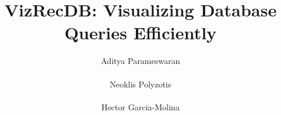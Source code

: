 \documentclass{sig-alternate}
\begin{document}
\newcommand{\VizRecDB}{{\sf VizRecDB}}
\newcommand{\calQ}{\mathcal{Q}}
\newcommand{\calR}{\mathcal{R}}
\newcommand{\att}[1]{{\text{#1}}}

\newtheorem{definition}{Definition}[section]
\newtheorem{example}[definition]{Example}
\newtheorem{goal}{Goal}[section]
\renewcommand{\baselinestretch}{0.995}





\newcommand{\squishlist}{
   \begin{list}{$\bullet$}
    { \setlength{\itemsep}{0pt}
      \setlength{\parsep}{2pt}
      \setlength{\topsep}{0pt}
      \setlength{\partopsep}{0pt}
      \leftmargin=25pt
\rightmargin=0pt
\labelsep=5pt
\labelwidth=10pt
\itemindent=0pt
\listparindent=0pt
\itemsep=\parsep
    }
}
\newcommand{\squishend}{\end{list}}

\newenvironment{denselist}{
    \begin{list}{\tiny{$\bullet$}}%
    {\setlength{\itemsep}{0ex} \setlength{\topsep}{0ex}
    \setlength{\parsep}{0pt} \setlength{\itemindent}{0pt}
    \setlength{\leftmargin}{0.5em}
    \setlength{\partopsep}{0pt}}}%
    {\end{list}}

\newcommand{\eat}[1]{}
\newcommand{\papertext}[1]{#1}
\newcommand{\techreport}[1]{}

\newcommand{\techreporttext}[1]{}
\newcommand{\stitle}[1]{\vspace{0.25em}\noindent\textbf{#1}}




\title{VizRecDB: Visualizing Database Queries Efficiently\vspace{-5pt}}



\author{
\alignauthor
Aditya Parameswaran \\ 
 \\
\alignauthor Neoklis Polyzotis \\ 
 \\ 
\alignauthor Hector Garcia-Molina \\ 
 \\ 
}
\end{document}
